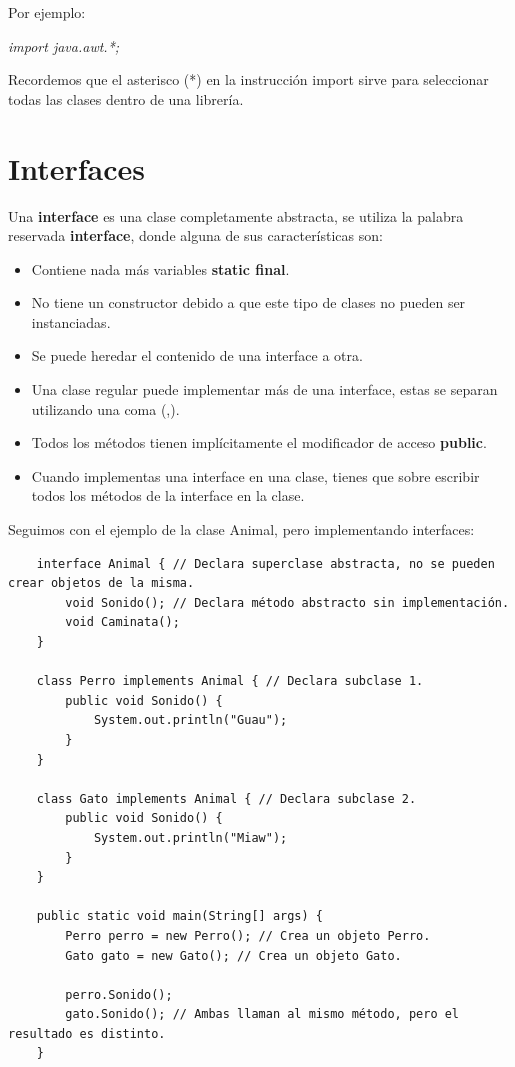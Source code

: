 Por ejemplo:
\begin{center}
	\textit{import java.awt.*;}
\end{center}

Recordemos que el asterisco (*) en la instrucción import sirve para seleccionar todas las clases dentro de una librería.



\section{Interfaces}
\hspace{0.55cm}Una \textbf{interface} es una clase completamente abstracta, se utiliza la palabra reservada \textbf{interface}, donde alguna de sus características son:
\begin{itemize}
    \item Contiene nada más variables \textbf{static final}.
    \item No tiene un constructor debido a que este tipo de clases no pueden ser instanciadas.
    \item Se puede heredar el contenido de una interface a otra.
    \item Una clase regular puede implementar más de una interface, estas se separan utilizando una coma (,).
    \item Todos los métodos tienen implícitamente el modificador de acceso \textbf{public}.
    \item Cuando implementas una interface en una clase, tienes que sobre escribir todos los métodos de la interface en la clase.
\end{itemize}

Seguimos con el ejemplo de la clase Animal, pero implementando interfaces:
\begin{lstlisting}
    interface Animal { // Declara superclase abstracta, no se pueden crear objetos de la misma.
        void Sonido(); // Declara método abstracto sin implementación.
        void Caminata();
    }
    
    class Perro implements Animal { // Declara subclase 1.
        public void Sonido() {
            System.out.println("Guau");
        }
    }
    
    class Gato implements Animal { // Declara subclase 2.
        public void Sonido() {
            System.out.println("Miaw");
        }
    }
    
    public static void main(String[] args) {
        Perro perro = new Perro(); // Crea un objeto Perro.
        Gato gato = new Gato(); // Crea un objeto Gato.
        
        perro.Sonido();
        gato.Sonido(); // Ambas llaman al mismo método, pero el resultado es distinto.
    }
\end{lstlisting}




